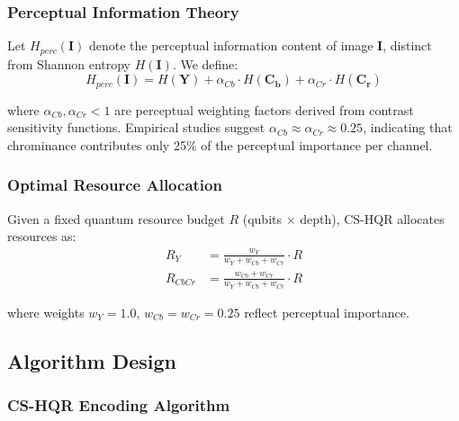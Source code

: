 \documentclass[11pt,a4paper]{article}
\begin{document}
\subsubsection{Perceptual Information Theory}

Let $H_{perc}(\mathbf{I})$ denote the perceptual information content of image $\mathbf{I}$, distinct from Shannon entropy $H(\mathbf{I})$. We define:
\begin{equation}
H_{perc}(\mathbf{I}) = H(\mathbf{Y}) + \alpha_{Cb} \cdot H(\mathbf{C_b}) + \alpha_{Cr} \cdot H(\mathbf{C_r})
\label{eq:perceptual_entropy}
\end{equation}

where $\alpha_{Cb}, \alpha_{Cr} < 1$ are perceptual weighting factors derived from contrast sensitivity functions. Empirical studies suggest $\alpha_{Cb} \approx \alpha_{Cr} \approx 0.25$, indicating that chrominance contributes only 25\% of the perceptual importance per channel.

\subsubsection{Optimal Resource Allocation}

Given a fixed quantum resource budget $R$ (qubits × depth), CS-HQR allocates resources as:
\begin{align}
R_Y &= \frac{w_Y}{w_Y + w_{Cb} + w_{Cr}} \cdot R \\
R_{CbCr} &= \frac{w_{Cb} + w_{Cr}}{w_Y + w_{Cb} + w_{Cr}} \cdot R
\end{align}

where weights $w_Y = 1.0$, $w_{Cb} = w_{Cr} = 0.25$ reflect perceptual importance.

\vspace{0.5em}

\subsection{Algorithm Design}

\subsubsection{CS-HQR Encoding Algorithm}

\vspace{0.3em}
\end{document}
